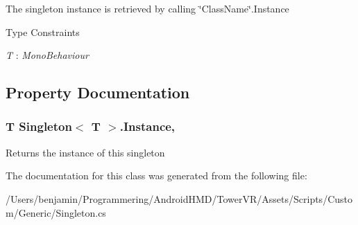 The singleton instance is retrieved by calling \char`\"{}\+Class\+Name\char`\"{}.Instance \begin{Desc}
\item[Type Constraints]\begin{description}
\item[{\em T} : {\em Mono\+Behaviour}]\end{description}
\end{Desc}


\subsection{Property Documentation}
\subsubsection[{\texorpdfstring{Instance}{Instance}}]{\setlength{\rightskip}{0pt plus 5cm}T {\bf Singleton}$<$ T $>$.Instance\hspace{0.3cm}{\ttfamily [static]}, {\ttfamily [get]}}\hypertarget{class_singleton_a54103e8475b2a352ee759d5732307534}{}\label{class_singleton_a54103e8475b2a352ee759d5732307534}
Returns the instance of this singleton 

The documentation for this class was generated from the following file\+:\begin{DoxyCompactItemize}
\item 
/\+Users/benjamin/\+Programmering/\+Android\+H\+M\+D/\+Tower\+V\+R/\+Assets/\+Scripts/\+Custom/\+Generic/Singleton.\+cs\end{DoxyCompactItemize}
